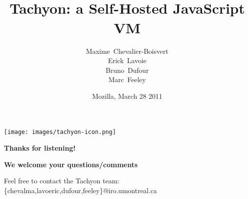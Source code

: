 \documentclass[xcolor=pdftex,dvipsnames,table]{beamer}
\title[Tachyon]{\Large\bfseries \\[0.025in] Tachyon: a Self-Hosted JavaScript VM\\[-0.125in] }
\author[Chevalier-Boisvert, Lavoie, Dufour, Feeley]
{
  Maxime~Chevalier-Boisvert\\
  Erick~Lavoie\\
  Bruno~Dufour\\
  Marc~Feeley
}
\institute[UdeM]
{
  \texttt{[image: images/logo-udem.png]}
}
\date[Mozilla 2011]
{\footnotesize Mozilla, March 28 2011}
\begin{document}
\begin{frame}

  \begin{center}
    \texttt{[image: images/tachyon-icon.png]}
  \end{center}

  \vspace*{-.25in}

  \titlepage
\end{frame}








\begin{frame}{}
\begin{center}
{\huge\bfseries Thanks for listening!}

\vspace{5mm}%
{\large\bfseries We welcome your questions/comments}

\vspace{5mm}%
Feel free to contact the Tachyon team:\\
{\small\ttfamily \{chevalma,lavoeric,dufour,feeley\}@iro.umontreal.ca}
\end{center}
\end{frame}
\end{document}
